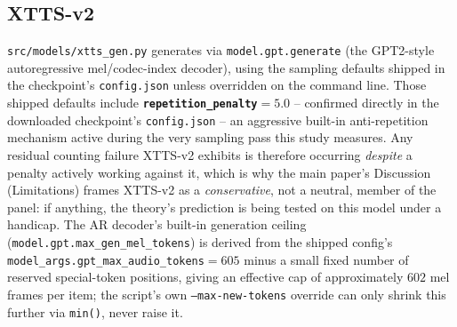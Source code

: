 \documentclass[11pt]{article}
\begin{document}
\subsection{XTTS-v2}

\texttt{src/models/xtts\_gen.py} generates via \texttt{model.gpt.generate}
(the GPT2-style autoregressive mel/codec-index decoder), using the sampling
defaults shipped in the checkpoint's \texttt{config.json} unless overridden
on the command line. Those shipped defaults include
\textbf{\texttt{repetition\_penalty}$=5.0$} -- confirmed directly in the
downloaded checkpoint's \texttt{config.json} -- an aggressive built-in
anti-repetition mechanism active during the very sampling pass this study
measures. Any residual counting failure XTTS-v2 exhibits is therefore
occurring \emph{despite} a penalty actively working against it, which is why
the main paper's Discussion (Limitations) frames XTTS-v2 as a
\emph{conservative}, not a neutral, member of the panel: if anything, the
theory's prediction is being tested on this model under a handicap. The AR
decoder's built-in generation ceiling
(\texttt{model.gpt.max\_gen\_mel\_tokens}) is derived from the shipped
config's \texttt{model\_args.gpt\_max\_audio\_tokens}$=605$ minus a small
fixed number of reserved special-token positions, giving an effective cap of
approximately $602$ mel frames per item; the script's own
\texttt{--max-new-tokens} override can only shrink this further via
\texttt{min()}, never raise it.
\end{document}
